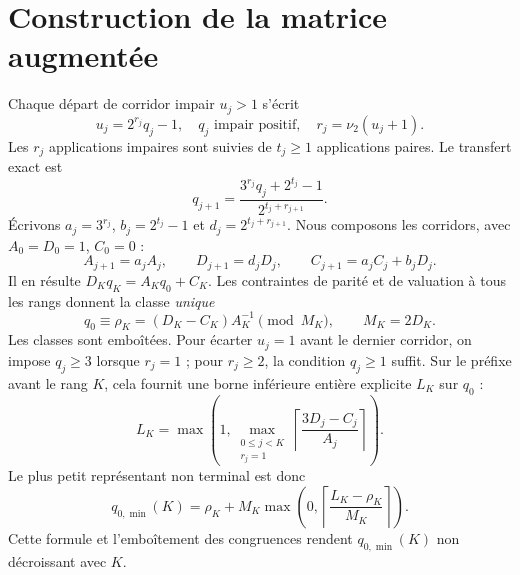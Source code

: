 \documentclass[11pt,a4paper]{article}
\newcommand{\vdeux}{\nu_2}
\begin{document}
\section{Construction de la matrice augmentée}
Chaque départ de corridor impair $u_j>1$ s'écrit
\[u_j=2^{r_j}q_j-1,\quad q_j\text{ impair positif},\quad r_j=\vdeux(u_j+1).\]
Les $r_j$ applications impaires sont suivies de $t_j\ge1$ applications paires. Le transfert exact est
\begin{equation}\label{eq:transfer}
\boxed{\displaystyle q_{j+1}=\frac{3^{r_j}q_j+2^{t_j}-1}{2^{t_j+r_{j+1}}}.}
\end{equation}
Écrivons $a_j=3^{r_j}$, $b_j=2^{t_j}-1$ et $d_j=2^{t_j+r_{j+1}}$. Nous composons les corridors, avec $A_0=D_0=1$, $C_0=0$ :
\begin{equation}\label{eq:affine}
\boxed{A_{j+1}=a_jA_j,\qquad D_{j+1}=d_jD_j,\qquad C_{j+1}=a_jC_j+b_jD_j.}
\end{equation}
Il en résulte $D_Kq_K=A_Kq_0+C_K$. Les contraintes de parité et de valuation à tous les rangs donnent la classe \emph{unique}
\begin{equation}\label{eq:rho}
\boxed{q_0\equiv \rho_K=(D_K-C_K)A_K^{-1}\pmod{M_K},\qquad M_K=2D_K.}
\end{equation}
Les classes sont emboîtées. Pour écarter $u_j=1$ avant le dernier corridor, on impose $q_j\ge3$ lorsque $r_j=1$ ; pour $r_j\ge2$, la condition $q_j\ge1$ suffit. Sur le préfixe avant le rang $K$, cela fournit une borne inférieure entière explicite $L_K$ sur $q_0$ :
\[
L_K=\max\left(1,\max_{\substack{0\le j<K\\r_j=1}}\left\lceil\frac{3D_j-C_j}{A_j}\right\rceil\right).
\]
Le plus petit représentant non terminal est donc
\begin{equation}\label{eq:qmin}
\boxed{q_{0,\min}(K)=\rho_K+M_K\max\!\left(0,\left\lceil\frac{L_K-\rho_K}{M_K}\right\rceil\right).}
\end{equation}
Cette formule et l'emboîtement des congruences rendent $q_{0,\min}(K)$ non décroissant avec $K$.
\end{document}
